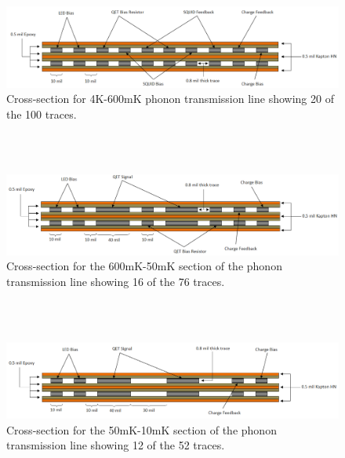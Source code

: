 \documentclass{report}
\begin{document}
\newpage

\begin{figure}[h]
\centering
\includegraphics[width = .9\textwidth]{4K_600mK_diagram.png}
\caption{Cross-section for 4K-600mK phonon transmission line showing 20 of the 100 traces.}
\end{figure}
~\\
~\\
\begin{figure}[h]
\centering
\includegraphics[width = .9\textwidth]{600mK_50mK_diagram.png}
\caption{Cross-section for the 600mK-50mK section of the phonon transmission line showing 16 of the 76 traces.}
\end{figure}
~\\
~\\
\begin{figure}[h]
\centering
\includegraphics[width = .9\textwidth]{50mK_10mK_diagram.png}
\caption{Cross-section for the 50mK-10mK section of the phonon transmission line showing 12 of the 52 traces.}
\end{figure}

\newpage
\end{document}
